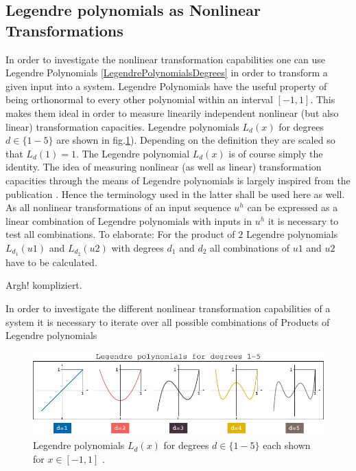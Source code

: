 \subsection{Legendre polynomials as Nonlinear Transformations}
	In order to investigate the nonlinear transformation capabilities one can use Legendre Polynomials \ref{LegendrePolynomialsDegrees} in order to transform a given input into a system. Legendre Polynomials have the useful property of being orthonormal to every other polynomial within an interval $\left[-1,1\right]$. This makes them ideal in order to measure linearily independent nonlinear (but also linear) transformation capacities. Legendre polynomials $L_{d}(x)$ for degrees $d \in \{1-5\}$ are shown in fig.\ref{fig:legendreDegrees}). Depending on the definition they are scaled so that $L_{d}(1)=1$. The Legendre polynomial $L_{d}(x)$ is of course simply the identity. 
	The idea of measuring nonlinear (as well as linear) transformation capacities through the means of Legendre polynomials is largely inspired from the publication \cite{DAM12}. Hence the terminology used in the latter shall be used here as well. 
	As all nonlinear transformations of an input sequence $u^{h}$ can be expressed as a linear combination of Legendre polynomials with inputs in $u^{h}$ it is necessary to test all combinations. To elaborate: For the product of $2$ Legendre polynomials $L_{d_{1}}(u1)$ and $L_{d_{2}}(u2)$ with degrees $d_1$ and $d_2$ all combinations of $u1$ and $u2$ have to be calculated.
	
	Argh! kompliziert. \
	
	
	
	In order to investigate the different nonlinear transformation capabilities of a system it is necessary to iterate over all possible combinations of Products of Legendre polynomials  
	
	\begin{figure}
		\includegraphics[width=0.99\linewidth]{pics/legendre_degrees}
		\caption{Legendre polynomials $L_{d}(x)$ for degrees $d \in \{1-5\}$ each shown for $x \in [-1,1]$ .}
		\label{fig:legendreDegrees}
	\end{figure}
	
